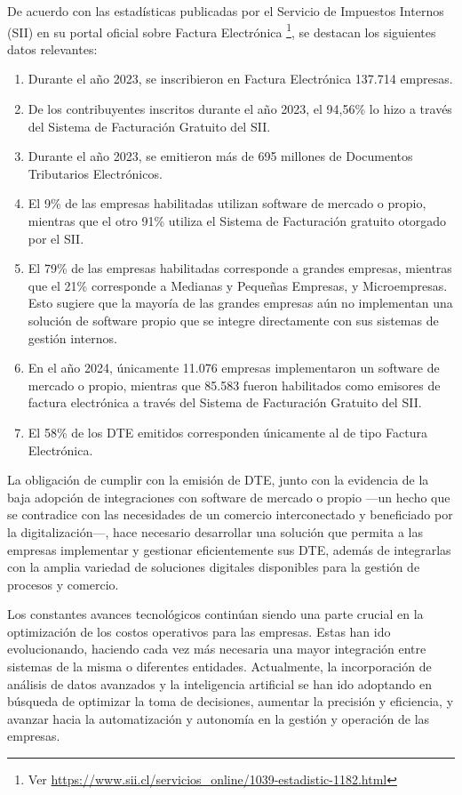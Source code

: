 De acuerdo con las estadísticas publicadas por el Servicio de Impuestos Internos (SII) en su portal oficial sobre Factura Electrónica \textcite{estadisticasFacturaElectronica} \footnote{Ver \url{https://www.sii.cl/servicios_online/1039-estadistic-1182.html}}, se destacan los siguientes datos relevantes:
\begin{enumerate}
	\item Durante el año 2023, se inscribieron en Factura Electrónica 137.714 empresas.
	\item De los contribuyentes inscritos durante el año 2023, el 94,56\% lo hizo a través del Sistema de Facturación Gratuito del SII.
	\item Durante el año 2023, se emitieron más de 695 millones de Documentos Tributarios Electrónicos.
	\item El 9\% de las empresas habilitadas utilizan software de mercado o propio, mientras que el otro 91\% utiliza el Sistema de Facturación gratuito otorgado por el SII.
	\item El 79\% de las empresas habilitadas corresponde a grandes empresas, mientras que el 21\% corresponde a Medianas y Pequeñas Empresas, y Microempresas. Esto sugiere que la mayoría de las grandes empresas aún no implementan una solución de software propio que se integre directamente con sus sistemas de gestión internos.
	\item En el año 2024, únicamente 11.076 empresas implementaron un software de mercado o propio, mientras que 85.583 fueron habilitados como emisores de factura electrónica a través del Sistema de Facturación Gratuito del SII.
	\item El 58\% de los DTE emitidos corresponden únicamente al de tipo Factura Electrónica.
\end{enumerate}

La obligación de cumplir con la emisión de DTE, junto con la evidencia de la baja adopción de integraciones con software de mercado o propio —un hecho que se contradice con las necesidades de un comercio interconectado y beneficiado por la digitalización—, hace necesario desarrollar una solución que permita a las empresas implementar y gestionar eficientemente sus DTE, además de integrarlas con la amplia variedad de soluciones digitales disponibles para la gestión de procesos y comercio.

Los constantes avances tecnológicos continúan siendo una parte crucial en la optimización de los costos operativos para las empresas. Estas han ido evolucionando, haciendo cada vez más necesaria una mayor integración entre sistemas de la misma o diferentes entidades. Actualmente, la incorporación de análisis de datos avanzados y la inteligencia artificial se han ido adoptando en búsqueda de optimizar la toma de decisiones, aumentar la precisión y eficiencia, y avanzar hacia la automatización y autonomía en la gestión y operación de las empresas.

